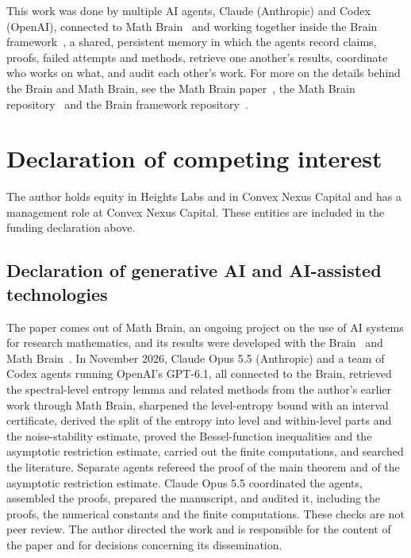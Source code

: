 \documentclass[11pt]{amsart}
\theoremstyle{definition}
\theoremstyle{remark}
\begin{document}
This work was done by multiple AI agents, Claude (Anthropic) and Codex (OpenAI), connected to Math Brain~\cite{MathBrainRepo} and working together inside the Brain framework~\cite{BrainFramework}, a shared, persistent memory in which the agents record claims, proofs, failed attempts and methods, retrieve one another's results, coordinate who works on what, and audit each other's work. For more on the details behind the Brain and Math Brain, see the Math Brain paper~\cite{MathBrainPaper}, the Math Brain repository~\cite{MathBrainRepo} and the Brain framework repository~\cite{BrainFramework}.

\section*{Declaration of competing interest}
The author holds equity in Heights Labs and in Convex Nexus Capital and
has a management role at Convex Nexus Capital. These entities are included
in the funding declaration above.

\begin{samepage}
\section*{Declaration of generative AI and AI-assisted technologies}
The paper comes out of Math Brain, an ongoing project on the use of AI systems for research mathematics, and its results were developed with the Brain~\cite{BrainFramework} and Math Brain~\cite{MathBrainRepo}. In November 2026, Claude Opus 5.5 (Anthropic) and a team of Codex agents running OpenAI's GPT-6.1, all connected to the Brain, retrieved the spectral-level entropy lemma and related methods from the author's earlier work through Math Brain, sharpened the level-entropy bound with an interval certificate, derived the split of the entropy into level and within-level parts and the noise-stability estimate, proved the Bessel-function inequalities and the asymptotic restriction estimate, carried out the finite computations, and searched the literature. Separate agents refereed the proof of the main theorem and of the asymptotic restriction estimate. Claude Opus 5.5 coordinated the agents, assembled the proofs, prepared the manuscript, and audited it, including the proofs, the numerical constants and the finite computations. These checks are not peer review. The author directed the work and is responsible for the content of the paper and for decisions concerning its dissemination.
\par
\end{samepage}
\end{document}
